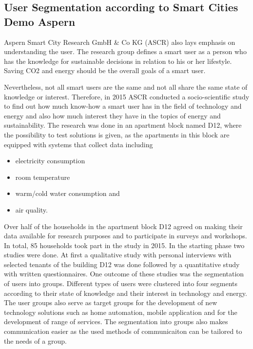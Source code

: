 \subsection{User Segmentation according to Smart Cities Demo Aspern}
\label{chap:usersegmentation}

Aspern Smart City Research GmbH \& Co KG (ASCR) also lays emphasis on understanding the user. The research group defines a smart user as a person who has the knowledge for sustainable decisions in relation to his or her lifestyle. Saving CO2 and energy should be the overall goals of a smart user.

Nevertheless, not all smart users are the same and not all share the same state of knowledge or interest. Therefore, in 2015 ASCR conducted a socio-scientific study to find out how much know-how a smart user has in the field of technology and energy and also how much interest they have in the topics of energy and sustainability. The research was done in an apartment block named D12, where the possibility to test solutions is given, as the apartments in this block are equipped with systems that collect data including

\begin{itemize}
	\item electricity consumption
	\item room temperature
	\item warm/cold water consumption and
	\item air quality.
\end{itemize}

Over half of the households in the apartment block D12 agreed on making their data available for research purposes and to participate in surveys and workshops. In total, 85 households took part in the study in 2015. In the starting phase two studies were done. At first a qualitative study with personal interviews with selected tenants of the building D12 was done followed by a quantitative study with written questionnaires. One outcome of these studies was the segmentation of users into groups. Different types of users were clustered into four segments according to their state of knowledge and their interest in technology and energy. The user groups also serve as target groups for the development of new technology solutions such as home automation, mobile application and for the development of range of services. The segmentation into groups also makes communication easier as the used methods of communicaiton can be tailored to the needs of a group.

